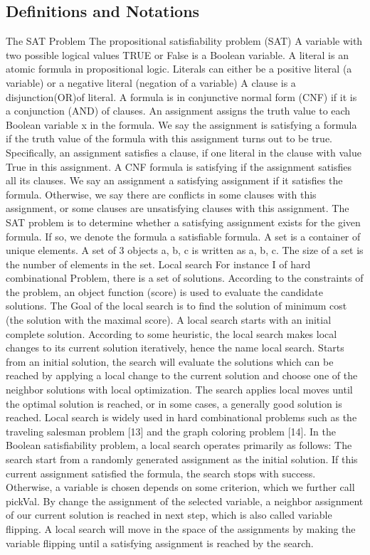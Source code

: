 \documentclass[12pt,a4paper,twoside]{scrartcl}
\numberwithin{equation}{section}
\begin{document}
\subsection{Definitions and Notations} 
The SAT Problem
The propositional satisfiability problem (SAT)  
A variable with two possible logical values TRUE or False is a Boolean variable. 
A literal is an atomic formula in propositional logic. Literals can either be a positive literal (a variable) or a negative literal (negation of a variable)
A clause is a disjunction(OR)of literal.
A formula is in conjunctive normal form (CNF) if it is a conjunction (AND) of clauses.  
An assignment assigns the truth value to each Boolean variable x in the formula. We say the assignment is satisfying a formula if the truth value of the formula with this assignment turns out to be true. Specifically, an assignment satisfies a clause, if one literal in the clause with value True in this assignment. A CNF formula is satisfying if the assignment satisfies all its clauses. We say an assignment a satisfying assignment if it satisfies the formula. Otherwise, we say there are conflicts in some clauses with this assignment, or some clauses are unsatisfying clauses with this assignment. 
The SAT problem is to determine whether a satisfying assignment exists for the given formula. If so, we denote the formula a satisfiable formula. 
A set is a container of unique elements. A set of 3 objects a, b, c is written as {a, b, c}. The
size of a set is the number of elements in the set.
Local search
For instance I of hard combinational Problem, there is a set of solutions.  According to the constraints of the problem, an object function (score) is used to evaluate the candidate solutions. The Goal of the local search is to find the solution of minimum cost (the solution with the maximal score).
A local search starts with an initial complete solution. According to some heuristic, the local search makes local changes to its current solution iteratively, hence the name local search. Starts from an initial solution, the search will evaluate the solutions which can be reached by applying a local change to the current solution and choose one of the neighbor solutions with local optimization. The search applies local moves until the optimal solution is reached, or in some cases, a generally good solution is reached.  Local search is widely used in hard combinational problems such as the traveling salesman problem [13] and the graph coloring problem [14]. 
In the Boolean satisfiability problem, a local search operates primarily as follows: The search start from a randomly generated assignment as the initial solution. If this current assignment satisfied the formula, the search stops with success. Otherwise, a variable is chosen depends on some criterion, which we further call pickVal. By change the assignment of the selected variable, a neighbor assignment of our current solution is reached in next step, which is also called variable flipping. A local search will move in the space of the assignments by making the variable flipping until a satisfying assignment is reached by the search.  
\end{document}
